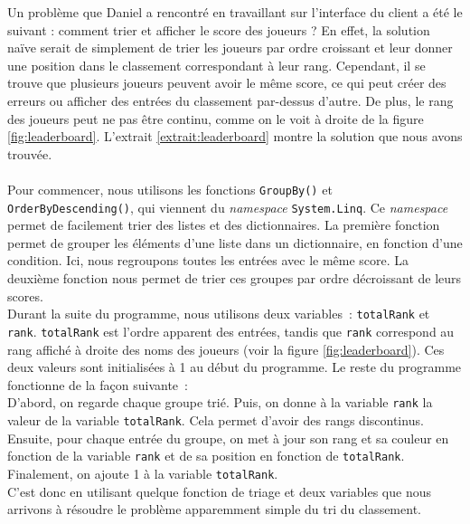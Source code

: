 \documentclass[a4paper]{article}
\begin{document}
\newpage
\noindent Un problème que Daniel a rencontré en travaillant sur l'interface du client a été le suivant : comment trier et afficher le score des joueurs ? En effet, la solution naïve serait de simplement de trier les joueurs par ordre croissant et leur donner une position dans le classement correspondant à leur rang. Cependant, il se trouve que plusieurs joueurs peuvent avoir le même score, ce qui peut créer des erreurs ou afficher des entrées du classement par-dessus d'autre. De plus, le rang des joueurs peut ne pas être continu, comme on le voit à droite de la figure \ref{fig:leaderboard}. L'extrait \ref{extrait:leaderboard} montre la solution que nous avons trouvée. \\
\\
Pour commencer, nous utilisons les fonctions \texttt{GroupBy()} et \texttt{OrderByDescending()}, qui viennent du \textit{namespace} \cite{namespace} \texttt{System.Linq}. Ce \textit{namespace} permet  de facilement trier des listes et des dictionnaires. La première fonction permet de grouper les éléments d'une liste dans un dictionnaire, en fonction d'une condition. Ici, nous regroupons toutes les entrées avec le même score. La deuxième fonction nous permet de trier ces groupes par ordre décroissant de leurs scores.  \\
Durant la suite du programme, nous utilisons deux variables : \texttt{totalRank} et \texttt{rank}. \texttt{totalRank} est l'ordre apparent des entrées, tandis que \texttt{rank} correspond au rang affiché à droite des noms des joueurs (voir la figure \ref{fig:leaderboard}).  Ces deux valeurs sont initialisées à 1 au début du programme. Le reste du programme fonctionne de la façon suivante : \\
D'abord, on regarde chaque groupe trié. Puis, on donne à la variable \texttt{rank} la valeur de la variable \texttt{totalRank}. Cela permet d'avoir des rangs discontinus. Ensuite, pour chaque entrée du groupe, on met à jour son rang et sa couleur en fonction de la variable \texttt{rank} et de sa position en fonction de \texttt{totalRank}. Finalement, on ajoute 1 à la variable \texttt{totalRank}. \\
C'est donc en utilisant quelque fonction de triage et deux variables que nous arrivons à résoudre le problème apparemment simple du tri du classement.
\end{document}
